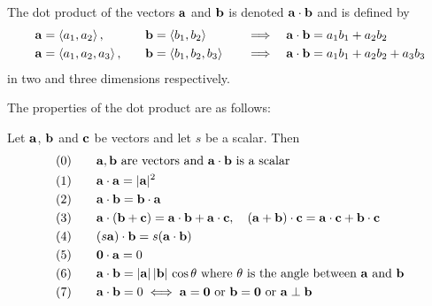 \begin{defn}\label{def:dotProd}
The dot product of the vectors $\mathbf{a}$ and $\mathbf{b}$ is denoted $\mathbf{a}\cdot\mathbf{b}$ 
and is defined by
\begin{alignat*}{5}
&\mathbf{a}=\left< a_1,a_2\right> ,\quad &&\mathbf{b}=\left< b_1,b_2\right>\quad &\implies\quad
&\mathbf{a}\cdot\mathbf{b} = a_1b_1+a_2b_2\\
&\mathbf{a}=\left< a_1,a_2,a_3\right> ,\quad &&\mathbf{b}=\left< b_1,b_2,b_3\right>\quad &\implies\quad
&\mathbf{a}\cdot\mathbf{b} = a_1b_1+a_2b_2+a_3b_3
\end{alignat*}
in two and three dimensions respectively. 
\end{defn}
The properties of the dot 
product are as follows:
\begin{theorem}\label{thm:dotPppties}
Let $\mathbf{a}$, $\mathbf{b}$ and $\mathbf{c}$ be vectors and let $s$ be a scalar. Then
\begin{alignat*}{3}
&(0)\quad &&\mathbf{a},\mathbf{b}\text{ are vectors and }\mathbf{a}\cdot\mathbf{b}
              \text{ is a scalar}\\
&(1) &&\mathbf{a}\cdot\mathbf{a}=|\mathbf{a}|^2\\
&(2) &&\mathbf{a}\cdot\mathbf{b}=\mathbf{b}\cdot\mathbf{a}\\
&(3) &&\mathbf{a}\cdot(\mathbf{b}+\mathbf{c})=\mathbf{a}\cdot\mathbf{b}+\mathbf{a}\cdot\mathbf{c},\quad 
       (\mathbf{a}+\mathbf{b})\cdot\mathbf{c}=\mathbf{a}\cdot\mathbf{c}+\mathbf{b}\cdot\mathbf{c}\\
&(4) &&(s\mathbf{a})\cdot\mathbf{b}= s(\mathbf{a}\cdot\mathbf{b})\\
&(5)  &&\mathbf{0} \cdot\mathbf{a}=0\\
&(6) &&\mathbf{a}\cdot\mathbf{b}=|\mathbf{a}|\,|\mathbf{b}|\,\cos\theta
        \text{ where $\theta$ is the angle between $\mathbf{a}$ and $\mathbf{b}$}\\
&(7) &&\mathbf{a}\cdot\mathbf{b}=0\iff \mathbf{a}=\mathbf{0} \text{ or }\mathbf{b}=\mathbf{0} 
    \text{ or } \mathbf{a}\perp\mathbf{b}
\end{alignat*}
\end{theorem}
